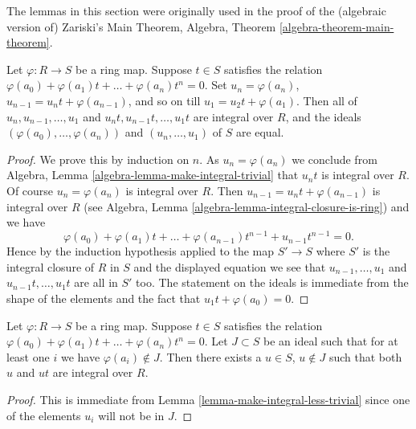 \noindent
The lemmas in this section were originally used in the proof of the
(algebraic version of) Zariski's Main Theorem,
Algebra, Theorem \ref{algebra-theorem-main-theorem}.

\begin{lemma}
\label{lemma-make-integral-less-trivial}
Let $\varphi : R \to S$ be a ring map.
Suppose $t \in S$ satisfies the
relation $\varphi(a_0) + \varphi(a_1)t + \ldots + \varphi(a_n) t^n = 0$.
Set $u_n = \varphi(a_n)$, $u_{n-1} = u_n t + \varphi(a_{n-1})$,
and so on till $u_1 = u_2 t + \varphi(a_1)$.
Then all of $u_n, u_{n-1}, \ldots, u_1$ and
$u_nt, u_{n-1}t, \ldots, u_1t$ are integral over $R$,
and the ideals $(\varphi(a_0), \ldots, \varphi(a_n))$ and
$(u_n, \ldots, u_1)$ of $S$ are equal.
\end{lemma}

\begin{proof}
We prove this by induction on $n$. As $u_n = \varphi(a_n)$ we
conclude from
Algebra, Lemma \ref{algebra-lemma-make-integral-trivial}
that $u_nt$ is integral over $R$. Of course
$u_n = \varphi(a_n)$ is integral over $R$. Then
$u_{n - 1} = u_n t  + \varphi(a_{n - 1})$ is integral over $R$ (see
Algebra, Lemma \ref{algebra-lemma-integral-closure-is-ring})
and we have
$$
\varphi(a_0) + \varphi(a_1)t + \ldots + \varphi(a_{n - 1})t^{n - 1} +
u_{n - 1}t^{n - 1} = 0.
$$
Hence by the induction hypothesis applied to the map
$S' \to S$ where $S'$ is the integral closure of $R$ in $S$
and the displayed equation we see that
$u_{n-1}, \ldots, u_1$ and $u_{n-1}t, \ldots, u_1t$
are all in $S'$ too. The statement on the ideals is immediate from the
shape of the elements and the fact that $u_1t + \varphi(a_0) = 0$.
\end{proof}

\begin{lemma}
\label{lemma-make-integral-not-in-ideal}
Let $\varphi : R \to S$ be a ring map.
Suppose $t \in S$ satisfies the
relation $\varphi(a_0) + \varphi(a_1)t + \ldots + \varphi(a_n) t^n = 0$.
Let $J \subset S$ be an ideal such that for at
least one $i$ we have $\varphi(a_i) \not \in J$.
Then there exists a $u \in S$, $u \not\in J$ such
that both $u$ and $ut$ are integral over $R$.
\end{lemma}

\begin{proof}
This is immediate from Lemma \ref{lemma-make-integral-less-trivial}
since one of the elements $u_i$ will not be in $J$.
\end{proof}

